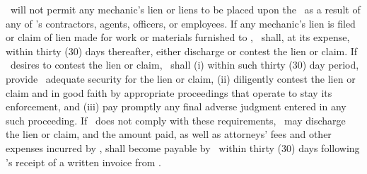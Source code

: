 \lessee\ will not permit any mechanic’s lien or liens to be placed upon the \property\ as a result of any of \lessee’s contractors, agents, officers, or employees. If any mechanic’s lien is filed or claim of lien made for work or materials furnished to \lessee, \lessee\ shall, at its expense, within thirty (30) days thereafter, either discharge or contest the lien or claim. If \lessee\ desires to contest the lien or claim, \lessee\ shall (i) within such thirty (30) day period, provide \lessor\ adequate security for the lien or claim, (ii) diligently contest the lien or claim and in good faith by appropriate proceedings that operate to stay its enforcement, and (iii) pay promptly any final adverse judgment entered in any such proceeding. If \lessee\ does not comply with these requirements, \lessor\ may discharge the lien or claim, and the amount paid, as well as attorneys’ fees and other expenses incurred by \lessor, shall become payable by \lessee\ within thirty (30) days following \lessee’s receipt of a written invoice from \lessor.
